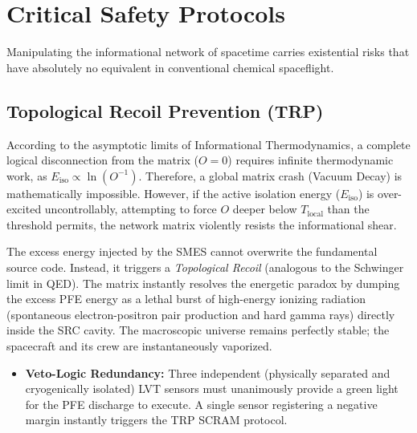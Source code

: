 \documentclass[12pt,a4paper]{article}
\begin{document}
\section{Critical Safety Protocols}
Manipulating the informational network of spacetime carries existential risks that have absolutely no equivalent in conventional chemical spaceflight.

\subsection{Topological Recoil Prevention (TRP)}
According to the asymptotic limits of Informational Thermodynamics, a complete logical disconnection from the matrix ($O = 0$) requires infinite thermodynamic work, as $E_{\mathrm{iso}} \propto \ln(O^{-1})$. Therefore, a global matrix crash (Vacuum Decay) is mathematically impossible. However, if the active isolation energy ($E_{\mathrm{iso}}$) is over-excited uncontrollably, attempting to force $O$ deeper below $T_{\mathrm{local}}$ than the threshold permits, the network matrix violently resists the informational shear.

The excess energy injected by the SMES cannot overwrite the fundamental source code. Instead, it triggers a \textit{Topological Recoil} (analogous to the Schwinger limit in QED). The matrix instantly resolves the energetic paradox by dumping the excess PFE energy as a lethal burst of high-energy ionizing radiation (spontaneous electron-positron pair production and hard gamma rays) directly inside the SRC cavity. The macroscopic universe remains perfectly stable; the spacecraft and its crew are instantaneously vaporized.

\vspace{0.5em}
\noindent{}
\vspace{1em}

\begin{itemize}
    \item \textbf{Veto-Logic Redundancy:} Three independent (physically separated and cryogenically isolated) LVT sensors must unanimously provide a green light for the PFE discharge to execute. A single sensor registering a negative margin instantly triggers the TRP SCRAM protocol.
\end{itemize}
\end{document}
